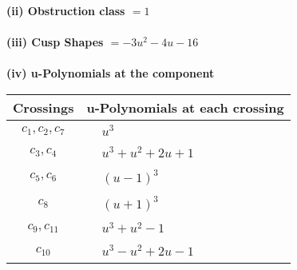 \documentclass[1p]{elsarticle_modified}
\theoremstyle{definition}
\begin{document}
\flushleft \textbf{(ii) Obstruction class $= 1$}\\~\\
\flushleft \textbf{(iii) Cusp Shapes $= -3 u^2-4 u-16$}\\~\\
\newpage\renewcommand{\arraystretch}{1}
\flushleft \textbf{(iv) u-Polynomials at the component}\newline \\
\begin{tabular}{m{50pt}|m{274pt}}
Crossings & \hspace{64pt}u-Polynomials at each crossing \\
\hline $$\begin{aligned}c_{1},c_{2},c_{7}\end{aligned}$$&$\begin{aligned}
&u^3
\end{aligned}$\\
\hline $$\begin{aligned}c_{3},c_{4}\end{aligned}$$&$\begin{aligned}
&u^3+u^2+2 u+1
\end{aligned}$\\
\hline $$\begin{aligned}c_{5},c_{6}\end{aligned}$$&$\begin{aligned}
&(u-1)^3
\end{aligned}$\\
\hline $$\begin{aligned}c_{8}\end{aligned}$$&$\begin{aligned}
&(u+1)^3
\end{aligned}$\\
\hline $$\begin{aligned}c_{9},c_{11}\end{aligned}$$&$\begin{aligned}
&u^3+u^2-1
\end{aligned}$\\
\hline $$\begin{aligned}c_{10}\end{aligned}$$&$\begin{aligned}
&u^3- u^2+2 u-1
\end{aligned}$\\
\hline
\end{tabular}\\~\\
\newpage\renewcommand{\arraystretch}{1}
\end{document}
